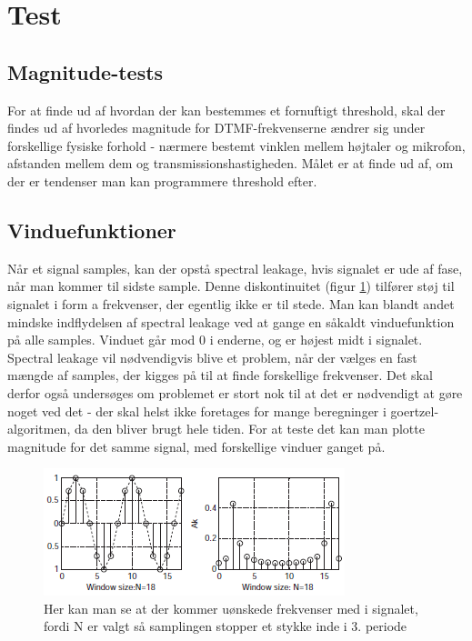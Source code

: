 \section{Test}

\subsection{Magnitude-tests}

For at finde ud af hvordan der kan bestemmes et fornuftigt threshold, skal der findes ud af hvorledes magnitude for DTMF-frekvenserne ændrer sig under forskellige fysiske forhold - nærmere bestemt vinklen mellem højtaler og mikrofon, afstanden mellem dem og transmissionshastigheden. Målet er at finde ud af, om der er tendenser man kan programmere threshold efter. 

\subsection{Vinduefunktioner}

Når et signal samples, kan der opstå spectral leakage, hvis signalet er ude af fase, når man kommer til sidste sample. Denne diskontinuitet (figur \ref{fig:Spectral}) tilfører støj til signalet i form a frekvenser, der egentlig ikke er til stede. Man kan blandt andet mindske indflydelsen af spectral leakage ved at gange en såkaldt vinduefunktion på alle samples. Vinduet går mod 0 i enderne, og er højest midt i signalet.\\
Spectral leakage vil nødvendigvis blive et problem, når der vælges en fast mængde af samples, der kigges på til at finde forskellige frekvenser. Det skal derfor også undersøges om problemet er stort nok til at det er nødvendigt at gøre noget ved det - der skal helst ikke foretages for mange beregninger i goertzel-algoritmen, da den bliver brugt hele tiden. For at teste det kan man plotte magnitude for det samme signal, med forskellige vinduer ganget på. 

\begin{figure}[h]
\centering
\includegraphics[scale=0.8]{Billeder/SpectralLeak.PNG}
\caption{Her kan man se at der kommer uønskede frekvenser med i signalet, fordi N er valgt så samplingen stopper et stykke inde i 3. periode}
\label{fig:Spectral}
\end{figure} 

